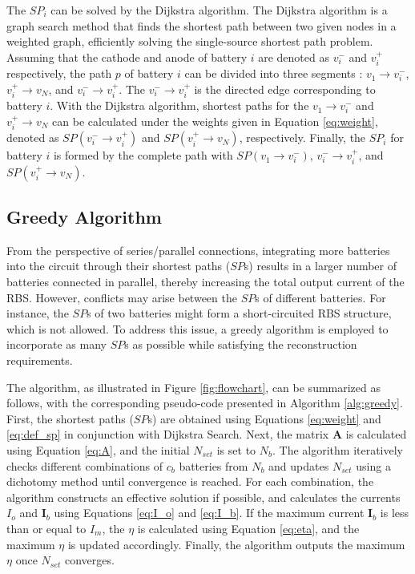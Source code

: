 \documentclass{article}
\begin{document}
The $SP_i$ can be solved by the Dijkstra algorithm.
The Dijkstra algorithm is a graph search method that finds the shortest path between two given nodes in a weighted graph, efficiently solving the single-source shortest path problem.
Assuming that the cathode and anode of battery $i$ are denoted as $v_i^-$ and $v_i^+$ respectively, the path $p$ of battery $i$  can be divided into three segments : $v_1 \rightarrow v_i^-$, $v_i^+ \rightarrow v_N$, and $v_i^- \rightarrow v_i^+$.
The $v_i^- \rightarrow v_i^+$ is the directed edge corresponding to battery $i$. 
With the Dijkstra algorithm, shortest paths for the $v_1 \rightarrow v_i^-$ and $v_i^+ \rightarrow v_N$ can be calculated under the weights given in Equation \ref{eq:weight}, denoted as $SP(v_i^- \rightarrow v_i^+)$ and $SP(v_i^+ \rightarrow v_N)$, respectively.
Finally, the $SP_i$ for battery $i$ is formed by the complete path with $SP(v_1 \rightarrow v_i^-)$, $v_i^- \rightarrow v_i^+$, and $SP(v_i^+ \rightarrow v_N)$.

\subsection{Greedy Algorithm}\label{subsec:greedy_solution}

From the perspective of series/parallel connections, integrating more batteries into the circuit through their shortest paths ($SP$s) results in a larger number of batteries connected in parallel, thereby increasing the total output current of the RBS.
However, conflicts may arise between the $SP$s of different batteries. 
For instance, the $SP$s of two batteries might form a short-circuited RBS structure, which is not allowed. 
To address this issue, a greedy algorithm is employed to incorporate as many $SP$s as possible while satisfying the reconstruction requirements.

The algorithm, as illustrated in Figure \ref{fig:flowchart}, can be summarized as follows, with the corresponding pseudo-code presented in Algorithm \ref{alg:greedy}.
First, the shortest paths ($SP$s) are obtained using Equations \ref{eq:weight} and \ref{eq:def_sp} in conjunction with Dijkstra Search. 
Next, the matrix $\bm{A}$ is calculated using Equation \ref{eq:A}, and the initial $N_{set}$ is set to $N_b$. 
The algorithm iteratively checks different combinations of $c_b$ batteries from $N_b$ and updates $N_{set}$ using a dichotomy method until convergence is reached. 
For each combination, the algorithm constructs an effective solution if possible, and calculates the currents $I_o$ and $\bm{I}_b$ using Equations \ref{eq:I_o} and \ref{eq:I_b}. 
If the maximum current $\bm{I}_b$ is less than or equal to $I_m$, the $\eta$ is calculated using Equation \ref{eq:eta}, and the maximum $\eta$ is updated accordingly. 
Finally, the algorithm outputs the maximum $\eta$ once $N_{set}$ converges.
\end{document}
